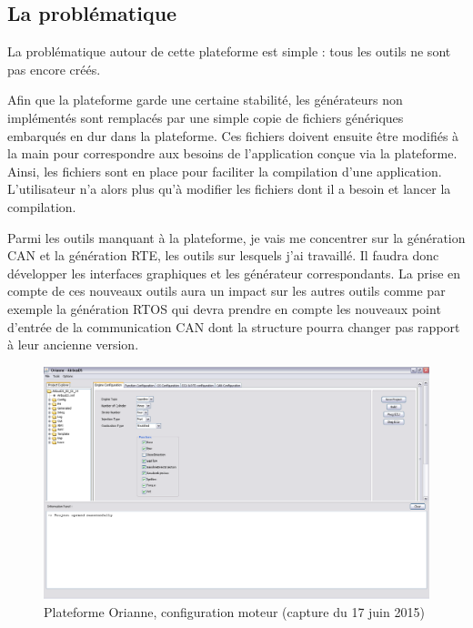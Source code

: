 \subsection{La problématique}
La problématique autour de cette plateforme est simple : tous les outils ne sont pas encore créés.

Afin que la plateforme garde une certaine stabilité, les générateurs non implémentés sont remplacés par une simple copie de fichiers génériques embarqués en dur dans la plateforme. Ces fichiers doivent ensuite être modifiés à la main pour correspondre aux besoins de l'application conçue via la plateforme. Ainsi, les fichiers sont en place pour faciliter la compilation d'une application. L'utilisateur n'a alors plus qu'à modifier les fichiers dont il a besoin et lancer la compilation.

Parmi les outils manquant à la plateforme, je vais me concentrer sur la génération CAN et la génération RTE, les outils sur lesquels j'ai travaillé. Il faudra donc développer les interfaces graphiques et les générateur correspondants. La prise en compte de ces nouveaux outils aura un impact sur les autres outils comme par exemple la génération RTOS qui devra prendre en compte les nouveaux point d'entrée de la communication CAN dont la structure pourra changer pas rapport à leur ancienne version.

\begin{figure}[h]
  \centering
  \includegraphics[angle=-90, scale=0.5]{images/plateforme}
  \caption{Plateforme Orianne, configuration moteur (capture du 17 juin 2015)}
  \label{fig:plateforme}
\end{figure}

